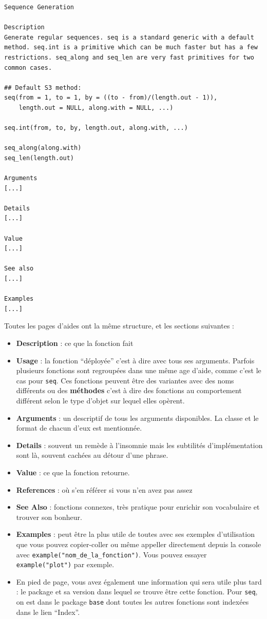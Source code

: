 \documentclass[
  letterpaper,
  DIV=11,
  numbers=noendperiod]{scrreprt}
\providecommand{\tightlist}{%
  \setlength{\itemsep}{0pt}\setlength{\parskip}{0pt}}\usepackage{longtable,booktabs,array}
\begin{document}
\begin{verbatim}
Sequence Generation

Description
Generate regular sequences. seq is a standard generic with a default method. seq.int is a primitive which can be much faster but has a few restrictions. seq_along and seq_len are very fast primitives for two common cases.

## Default S3 method:
seq(from = 1, to = 1, by = ((to - from)/(length.out - 1)),
    length.out = NULL, along.with = NULL, ...)

seq.int(from, to, by, length.out, along.with, ...)

seq_along(along.with)
seq_len(length.out)

Arguments
[...]

Details
[...]

Value
[...]

See also
[...]

Examples
[...]
\end{verbatim}

Toutes les pages d'aides ont la même structure, et les sections
suivantes :

\begin{itemize}
\tightlist
\item
  \textbf{Description} : ce que la fonction fait
\item
  \textbf{Usage} : la fonction ``déployée'' c'est à dire avec tous ses
  arguments. Parfois plusieurs fonctions sont regroupées dans une même
  age d'aide, comme c'est le cas pour \texttt{seq}. Ces fonctions
  peuvent être des variantes avec des noms différents ou des
  \textbf{méthodes} c'est à dire des fonctions au comportement différent
  selon le type d'objet sur lequel elles opèrent.
\item
  \textbf{Arguments} : un descriptif de tous les arguments disponibles.
  La classe et le format de chacun d'eux est mentionnée.
\item
  \textbf{Details} : souvent un remède à l'insomnie mais les subtilités
  d'implémentation sont là, souvent cachées au détour d'une phrase.
\item
  \textbf{Value} : ce que la fonction retourne.
\item
  \textbf{References} : où s'en référer si vous n'en avez pas assez
\item
  \textbf{See Also} : fonctions connexes, très pratique pour enrichir
  son vocabulaire et trouver son bonheur.
\item
  \textbf{Examples} : peut être la plus utile de toutes avec ses
  exemples d'utilisation que vous pouvez copier-coller ou même appeller
  directement depuis la console avec
  \texttt{example("nom\_de\_la\_fonction")}. Vous pouvez essayer
  \texttt{example("plot")} par exemple.
\item
  En pied de page, vous avez également une information qui sera utile
  plus tard : le package et sa version dans lequel se trouve être cette
  fonction. Pour \texttt{seq}, on est dans le package \texttt{base} dont
  toutes les autres fonctions sont indexées dans le lien ``Index''.
\end{itemize}
\end{document}
